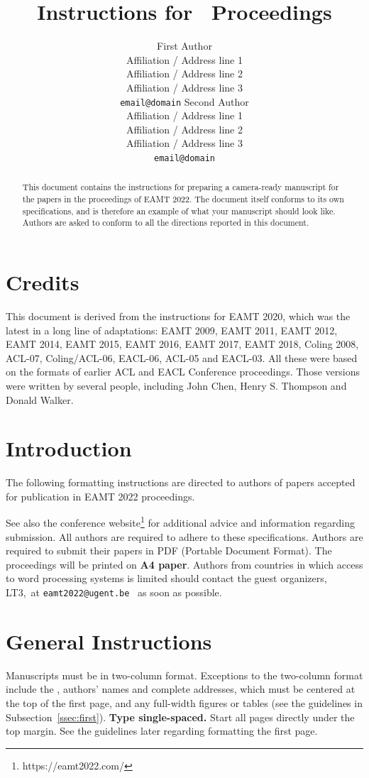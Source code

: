 \documentclass[11pt]{article}
\title{Instructions for \confname\ Proceedings}
\author{First Author\\
  Affiliation / Address line 1\\
  Affiliation / Address line 2\\
  Affiliation / Address line 3\\
  {\tt email@domain}  \And
  Second Author\\
  Affiliation / Address line 1\\
  Affiliation / Address line 2\\
  Affiliation / Address line 3\\
  {\tt email@domain}}
\date{}
\makeatletter
\newcommand{\confname}{EAMT 2022}
\newcommand{\urlwebsite}{https://eamt2022.com/}
\newcommand{\contactname}{the guest organizers, LT3,}
\newcommand{\contactemail}{\texttt{eamt2022@ugent.be}}
\makeatother
\begin{document}
\maketitle
\begin{abstract}
  This document contains the instructions for preparing a camera-ready
  manuscript for the papers in the
  proceedings of \confname . The document itself
  conforms to its own specifications, and is therefore an example of
  what your manuscript should look like. Authors are asked to conform
  to all the directions reported in this document.
\end{abstract}

\section{Credits}

This document is derived from the instructions for EAMT 2020, %
which was the latest in a long line of adaptations: EAMT 2009, EAMT 2011, EAMT 2012, EAMT 2014, EAMT 2015, EAMT 2016, EAMT 2017, EAMT 2018, Coling 2008, ACL-07, Coling/ACL-06, EACL-06, ACL-05 and EACL-03.  All these were based on the formats of earlier ACL and EACL Conference proceedings.  Those versions were written by several people, including John
Chen, Henry S. Thompson and Donald Walker.

\section{Introduction}

The following formatting instructions are directed to authors of
papers accepted for publication in \confname{} proceedings.

See also the
conference website\footnote{\urlwebsite} for additional
advice and information regarding submission.  All authors are required to adhere to these
specifications. Authors are required to submit their papers in PDF  (Portable Document
Format). The proceedings will be printed on
{\bf A4 paper}. Authors from countries in which access to
word processing systems is limited should contact \contactname~at \contactemail~ as soon as possible.

\section{General Instructions}

Manuscripts must be in two-column format.  Exceptions to the
two-column format include the {}, authors' names and complete
addresses, which must be centered at the top of the first page, and
any full-width figures or tables (see the guidelines in
Subsection~\ref{ssec:first}). {\bf Type single-spaced.}  Start all
pages directly under the top margin. See the guidelines later
regarding formatting the first page.
\end{document}
